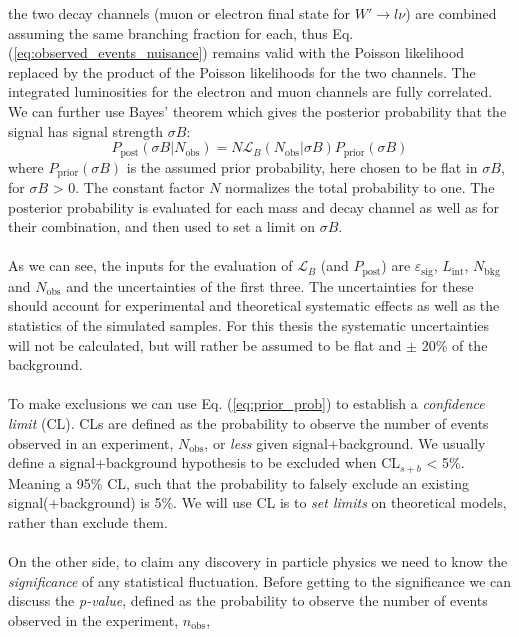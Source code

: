 \documentclass[12pt, a4paper]{book}
\begin{document}
the two decay channels (muon or electron final state for $W'\rightarrow l\nu$) are combined assuming the same branching fraction for each, thus Eq. (\ref{eq:observed_events_nuisance}) remains valid with the Poisson likelihood replaced by the product of the Poisson likelihoods for the two channels. 
The integrated luminosities for the electron and muon channels are fully correlated. We can further use Bayes' theorem which gives the posterior probability that the signal has signal strength $\sigma B$:
\begin{equation}\label{eq:prior_prob}
    P_{\text{post}}(\sigma B\vert N_{\text{obs}}) = N \mathcal{L}_B (N_{\text{obs}}\vert\sigma B) P_{\text{prior}}(\sigma B)
\end{equation}
where $P_{\text{prior}}(\sigma B)$ is the assumed prior probability, here chosen to be flat in $\sigma B$, for $\sigma B$ > 0. The constant factor $N$ normalizes the total probability to one. The posterior probability is evaluated for each mass and decay channel as well as for their 
combination, and then used to set a limit on $\sigma B$.\\
\\As we can see, the inputs for the evaluation of $\mathcal{L}_B$ (and $P_{\text{post}}$) are $\varepsilon_{\text{sig}}$, $L_{\text{int}}$, $N_{\text{bkg}}$ and $N_{\text{obs}}$ and the uncertainties of the first three. The uncertainties for these should account for experimental 
and theoretical systematic effects as well as the statistics of the simulated samples. For this thesis the systematic uncertainties will not be calculated, but will rather be assumed to be flat and $\pm$ 20\% of the background.\\
\\To make exclusions we can use Eq. (\ref{eq:prior_prob}) to establish a \textit{confidence limit} (CL). CLs are defined as the probability to observe the number of events observed in an experiment, $N_{\text{obs}}$, or \textit{less} given signal+background. We usually define a signal+background 
hypothesis to be excluded when CL$_{s+b}$ < 5\%. Meaning a 95\% CL, such that the probability to falsely exclude an existing signal(+background) is 5\%. We will use CL is to \textit{set limits} on theoretical models, rather than exclude them.\\
\\On the other side, to claim any discovery in particle physics we need to know the \textit{significance} of any statistical fluctuation. Before getting to the significance we can discuss the \textit{p-value}, defined as the probability to observe the number of events observed in the experiment, $n_{\text{obs}}$, 
\end{document}
